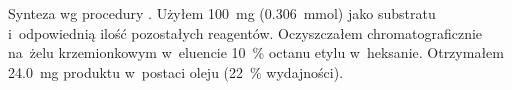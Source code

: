 Synteza wg procedury .
Użyłem \SI{100}{\mg} (\SI{0.306}{\milli\mole})  jako substratu
  i~odpowiednią ilość pozostałych reagentów.
Oczyszczałem chromatograficznie na~żelu krzemionkowym w~eluencie \SI{10}{\percent} octanu
  etylu w~heksanie.
Otrzymałem \SI{24.0}{\mg} produktu w~postaci oleju (\SI{22}{\percent} wydajności).
